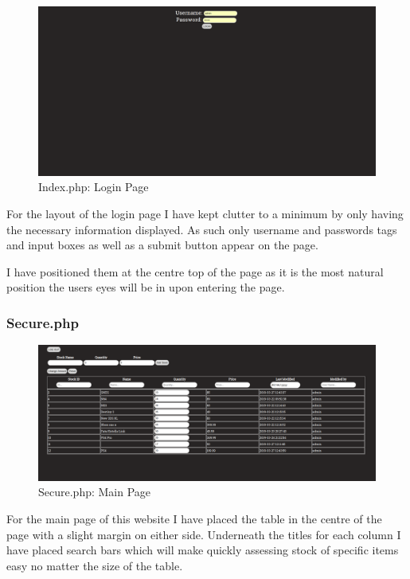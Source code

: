 \documentclass[10pt,a4paper]{report}
\begin{document}
	\begin{figure}[h]
		\centering
		\hspace*{-1in}
		\includegraphics[scale=0.25]{index}
		\caption{Index.php: Login Page}
	\end{figure}

	For the layout of the login page I have kept clutter to a minimum by only having the necessary information displayed. As such only username and passwords tags and input boxes as well as a submit button appear on the page.
	
	I have positioned them at the centre top of the page as it is the most natural position the users eyes will be in upon entering the page.
	
	\newpage
	\subsubsection{Secure.php}
	\begin{figure}[h]
		\centering
		\hspace*{-0.75in}
		\includegraphics[scale=0.25]{secure}
		\caption{Secure.php: Main Page}
	\end{figure}

	For the main page of this website I have placed the table in the centre of the page with a slight margin on either side. Underneath the titles for each column I have placed search bars which will make quickly assessing stock of specific items easy no matter the size of the table.
	
\end{document}
